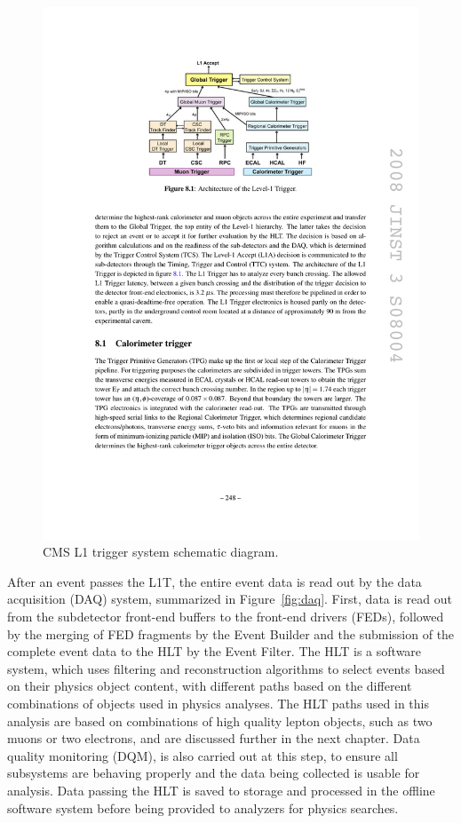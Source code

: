 \begin{figure}[tbh]
\centering
\includegraphics[width=5in]{figures/l1t.pdf}
\caption{CMS L1 trigger system schematic diagram.}
\label{fig:l1t}
\end{figure}

\indent After an event passes the L1T, the entire event data is read out by the data acquisition (DAQ) system, summarized in Figure~\ref{fig:daq}. First, data is read out from the subdetector front-end buffers to the front-end drivers (FEDs), followed by the merging of FED fragments by the Event Builder and the submission of the complete event data to the HLT by the Event Filter. The HLT is a software system, which uses filtering and reconstruction algorithms to select events based on their physics object content, with different paths based on the different combinations of objects used in physics analyses. The HLT paths used in this analysis are based on combinations of high quality lepton objects, such as two muons or two electrons, and are discussed further in the next chapter. Data quality monitoring (DQM), is also carried out at this step, to ensure all subsystems are behaving properly and the data being collected is usable for analysis. Data passing the HLT is saved to storage and processed in the offline software system before being provided to analyzers for physics searches. 

